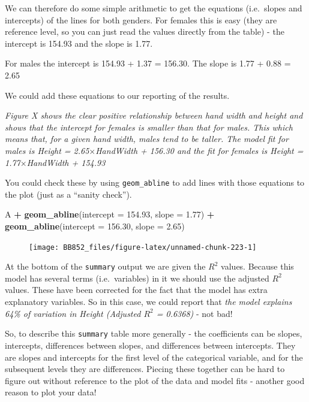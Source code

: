 \documentclass[
  a4paperpaper,
]{book}
\newenvironment{Shaded}{\begin{snugshade}}{\end{snugshade}}
\newcommand{\DataTypeTok}[1]{\textcolor[rgb]{0.13,0.29,0.53}{#1}}
\newcommand{\FloatTok}[1]{\textcolor[rgb]{0.00,0.00,0.81}{#1}}
\newcommand{\KeywordTok}[1]{\textcolor[rgb]{0.13,0.29,0.53}{\textbf{#1}}}
\newcommand{\NormalTok}[1]{#1}
\newcommand{\OperatorTok}[1]{\textcolor[rgb]{0.81,0.36,0.00}{\textbf{#1}}}
\newcommand{\StringTok}[1]{\textcolor[rgb]{0.31,0.60,0.02}{#1}}
\begin{document}
We can therefore do some simple arithmetic to get the equations (i.e.~slopes and intercepts) of the lines for both genders. For females this is easy (they are reference level, so you can just read the values directly from the table) - the intercept is 154.93 and the slope is 1.77.

For males the intercept is 154.93 + 1.37 = 156.30. The slope is 1.77 + 0.88 = 2.65

We could add these equations to our reporting of the results.

\emph{Figure X shows the clear positive relationship between hand width and height and shows that the intercept for females is smaller than that for males. This which means that, for a given hand width, males tend to be taller. The model fit for males is Height = 2.65\(\times\)HandWidth + 156.30 and the fit for females is Height = 1.77\(\times\)HandWidth + 154.93}

You could check these by using \texttt{geom\_abline} to add lines with those equations to the plot (just as a ``sanity check'').

\begin{Shaded}
\begin{Highlighting}[]
\NormalTok{A }\OperatorTok{+}\StringTok{ }
\StringTok{  }\KeywordTok{geom\_abline}\NormalTok{(}\DataTypeTok{intercept =} \FloatTok{154.93}\NormalTok{, }\DataTypeTok{slope =} \FloatTok{1.77}\NormalTok{) }\OperatorTok{+}\StringTok{ }
\StringTok{  }\KeywordTok{geom\_abline}\NormalTok{(}\DataTypeTok{intercept =} \FloatTok{156.30}\NormalTok{, }\DataTypeTok{slope =} \FloatTok{2.65}\NormalTok{)}
\end{Highlighting}
\end{Shaded}

\begin{figure}[ht]

{\centering \texttt{[image: BB852\_files/figure-latex/unnamed-chunk-223-1]} 

}

\end{figure}

At the bottom of the \texttt{summary} output we are given the \(R^2\) values. Because this model has several terms (i.e.~variables) in it we should use the adjusted \(R^2\) values. These have been corrected for the fact that the model has extra explanatory variables. So in this case, we could report that \emph{the model explains 64\% of variation in Height (Adjusted \(R^2\) = 0.6368)} - not bad!

So, to describe this \texttt{summary} table more generally - the coefficients can be slopes, intercepts, differences between slopes, and differences between intercepts. They are slopes and intercepts for the first level of the categorical variable, and for the subsequent levels they are differences. Piecing these together can be hard to figure out without reference to the plot of the data and model fits - another good reason to plot your data!
\end{document}
